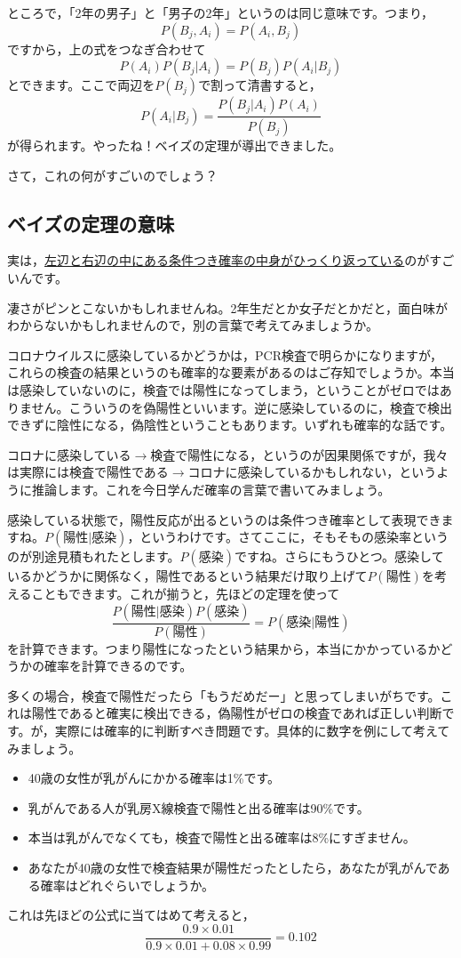 ところで，「2年の男子」と「男子の2年」というのは同じ意味です。つまり，
\[P(B_j,A_i) = P(A_i, B_j) \]
ですから，上の式をつなぎ合わせて
\[P(A_i)P(B_j|A_i) = P(B_j)P(A_i|B_j) \]
とできます。ここで両辺を$P(B_j)$で割って清書すると，
\[ P(A_i | B_j )=\frac{P(B_j|A_i)P(A_i)}{P(B_j)} \]
が得られます。やったね！ベイズの定理が導出できました。


さて，これの何がすごいのでしょう？ 
\subsection{ベイズの定理の意味}
実は，\underline{左辺と右辺の中にある条件つき確率の中身がひっくり返っている}のがすごいんです。

凄さがピンとこないかもしれませんね。2年生だとか女子だとかだと，面白味がわからないかもしれませんので，別の言葉で考えてみましょうか。

コロナウイルスに感染しているかどうかは，PCR検査で明らかになりますが，これらの検査の結果というのも確率的な要素があるのはご存知でしょうか。本当は感染していないのに，検査では陽性になってしまう，ということがゼロではありません。こういうのを偽陽性といいます。逆に感染しているのに，検査で検出できずに陰性になる，偽陰性ということもあります。いずれも確率的な話です。

コロナに感染している$\to$検査で陽性になる，というのが因果関係ですが，我々は実際には検査で陽性である$\to$コロナに感染しているかもしれない，というように推論します。これを今日学んだ確率の言葉で書いてみましょう。

感染している状態で，陽性反応が出るというのは条件つき確率として表現できますね。$P(\mbox{陽性}|\mbox{感染})$，というわけです。さてここに，そもそもの感染率というのが別途見積もれたとします。$P(\mbox{感染})$ですね。さらにもうひとつ。感染しているかどうかに関係なく，陽性であるという結果だけ取り上げて$P(\mbox{陽性})$を考えることもできます。これが揃うと，先ほどの定理を使って
\[ \frac{P(\mbox{陽性}|\mbox{感染})P(\mbox{感染})}{P(\mbox{陽性})} = P(\mbox{感染}|\mbox{陽性})\]
を計算できます。つまり陽性になったという結果から，本当にかかっているかどうかの確率を計算できるのです。

多くの場合，検査で陽性だったら「もうだめだー」と思ってしまいがちです。これは陽性であると確実に検出できる，偽陽性がゼロの検査であれば正しい判断です。が，実際には確率的に判断すべき問題です。具体的に数字を例にして考えてみましょう。

\begin{itemize}
    \item 40歳の女性が乳がんにかかる確率は1\%です。
    \item 乳がんである人が乳房X線検査で陽性と出る確率は90\%です。
    \item 本当は乳がんでなくても，検査で陽性と出る確率は8\%にすぎません。
    \item あなたが40歳の女性で検査結果が陽性だったとしたら，あなたが乳がんである確率はどれぐらいでしょうか。
\end{itemize}
これは先ほどの公式に当てはめて考えると，
\[\frac{0.9\times0.01}{0.9\times0.01+0.08\times0.99}=0.102 \]

